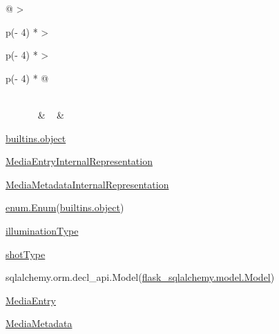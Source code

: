 \begin{longtable}[]{@{}
  >{\raggedright\arraybackslash}p{(\columnwidth - 4\tabcolsep) * }
  >{\raggedright\arraybackslash}p{(\columnwidth - 4\tabcolsep) * }
  >{\raggedright\arraybackslash}p{(\columnwidth - 4\tabcolsep) * }@{}}
\toprule
\endhead
{} \\
{~~~~~~} & ~ & \begin{minipage}[t]{\linewidth}\raggedright
\href{builtins.html\#object}{builtins.object}

\href{app.html\#MediaEntryInternalRepresentation}{MediaEntryInternalRepresentation}

\href{app.html\#MediaMetadataInternalRepresentation}{MediaMetadataInternalRepresentation}

\href{enum.html\#Enum}{enum.Enum}(\href{builtins.html\#object}{builtins.object})

\href{app.html\#illuminationType}{illuminationType}

\href{app.html\#shotType}{shotType}

sqlalchemy.orm.decl\_api.Model(\href{flask_sqlalchemy.model.html\#Model}{flask\_sqlalchemy.model.Model})

\href{app.html\#MediaEntry}{MediaEntry}

\href{app.html\#MediaMetadata}{MediaMetadata}


\end{minipage}
\end{longtable}
